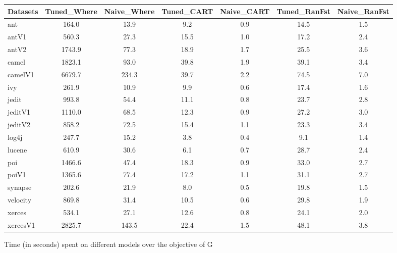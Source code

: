 \documentclass{sig-alternative}
\begin{document}
\begin{figure}[!ht]
\scriptsize
\centering
  \begin{tabular}{l|c |c |c |c |c |c }
    \hline\hline
    Datasets & Tuned\_Where & Naive\_Where & Tuned\_CART & Naive\_CART & Tuned\_RanFst & Naive\_RanFst\\
    \hline
    ant & 164.0 & 13.9 & 9.2 & 0.9 & 14.5 & 1.5\\
    antV1 & 560.3 & 27.3 & 15.5 & 1.0 & 17.2 & 2.4\\
    antV2 & 1743.9 & 77.3 & 18.9 & 1.7 & 25.5 & 3.6\\
    camel & 1823.1 & 93.0 & 39.8 & 1.9 & 39.1 & 3.4\\
    camelV1 & 6679.7 & 234.3 & 39.7 & 2.2 & 74.5 & 7.0\\
    ivy & 261.9 & 10.9 & 9.9 & 0.6 & 17.4 & 1.6\\
    jedit & 993.8 & 54.4 & 11.1 & 0.8 & 23.7 & 2.8\\
    jeditV1 & 1110.0 & 68.5 & 12.3 & 0.9 & 27.2 & 3.0\\
    jeditV2 & 858.2 & 72.5 & 15.4 & 1.1 & 23.3 & 3.4\\
    log4j & 247.7 & 15.2 & 3.8 & 0.4 & 9.1 & 1.4\\
    lucene & 610.9 & 30.6 & 6.1 & 0.7 & 28.7 & 2.4\\
    poi & 1466.6 & 47.4 & 18.3 & 0.9 & 33.0 & 2.7\\
    poiV1 & 1365.6 & 77.4 & 17.2 & 1.1 & 31.1 & 2.7\\
    synapse & 202.6 & 21.9 & 8.0 & 0.5 & 19.8 & 1.5\\
    velocity & 869.8 & 31.4 & 10.5 & 0.6 & 29.8 & 1.9\\
    xerces & 534.1 & 27.1 & 12.6 & 0.8 & 24.1 & 2.0\\
    xercesV1 & 2825.7 & 143.5 & 22.4 & 1.5 & 48.1 & 3.8\\
  \end{tabular}
  \caption{Time (in seconds) spent on different models over the objective of G}
\end{figure}
\end{document}
